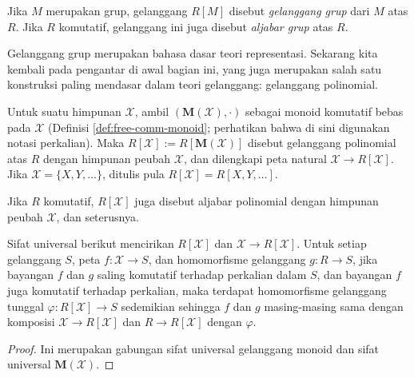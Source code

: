 \begin{definition}\label{def:group-ring}
	Jika $M$ merupakan grup, gelanggang $R[M]$ disebut \emph{gelanggang grup} dari $M$ atas $R$. Jika $R$ komutatif, gelanggang ini juga disebut \emph{aljabar grup} atas $R$.
\end{definition}

Gelanggang grup merupakan bahasa dasar teori representasi. Sekarang kita kembali pada pengantar di awal bagian ini, yang juga merupakan salah satu konstruksi paling mendasar dalam teori gelanggang: gelanggang polinomial.
\begin{definition} 
	Untuk suatu himpunan $\mathcal{X}$, ambil $(\mathbf{M}(\mathcal{X}), \cdot)$ sebagai monoid komutatif bebas pada $\mathcal{X}$ (Definisi \ref{def:free-comm-monoid}; perhatikan bahwa di sini digunakan notasi perkalian). Maka $R[\mathcal{X}] := R[\mathbf{M}(\mathcal{X})]$ disebut gelanggang polinomial atas $R$ dengan himpunan peubah $\mathcal{X}$, dan dilengkapi peta natural $\mathcal{X} \to R[\mathcal{X}]$. Jika $\mathcal{X} = \{X, Y, \ldots\}$, ditulis pula $R[\mathcal{X}] = R[X, Y, \ldots]$.
\end{definition}
Jika $R$ komutatif, $R[\mathcal{X}]$ juga disebut aljabar polinomial dengan himpunan peubah $\mathcal{X}$, dan seterusnya.

\begin{proposition}\label{prop:polynomial-ring-universal}
	Sifat universal berikut mencirikan $R[\mathcal{X}]$ dan $\mathcal{X} \to R[\mathcal{X}]$. Untuk setiap gelanggang $S$, peta $f: \mathcal{X} \to S$, dan homomorfisme gelanggang $g: R \to S$, jika bayangan $f$ dan $g$ saling komutatif terhadap perkalian dalam $S$, dan bayangan $f$ juga komutatif terhadap perkalian, maka terdapat homomorfisme gelanggang tunggal $\varphi: R[\mathcal{X}] \to S$ sedemikian sehingga $f$ dan $g$ masing-masing sama dengan komposisi $\mathcal{X} \to R[\mathcal{X}]$ dan $R \to R[\mathcal{X}]$ dengan $\varphi$.
\end{proposition}
\begin{proof}
	Ini merupakan gabungan sifat universal gelanggang monoid dan sifat universal $\mathbf{M}(\mathcal{X})$.
\end{proof}

